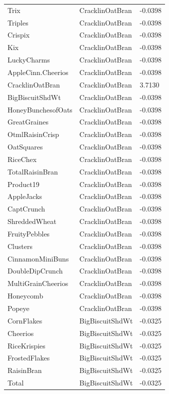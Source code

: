 \begin{table}[!htbp]
\begin{tabular}{lll}
\\
Trix & CracklinOatBran & -0.0398
\\
Triples & CracklinOatBran & -0.0398
\\
Crispix & CracklinOatBran & -0.0398
\\
Kix & CracklinOatBran & -0.0398
\\
LuckyCharms & CracklinOatBran & -0.0398
\\
AppleCinn.Cheerios & CracklinOatBran & -0.0398
\\
CracklinOatBran & CracklinOatBran & 3.7130
\\
BigBiscuitShdWt & CracklinOatBran & -0.0398
\\
HoneyBunchesofOats & CracklinOatBran & -0.0398
\\
GreatGraines & CracklinOatBran & -0.0398
\\
OtmlRaisinCrisp & CracklinOatBran & -0.0398
\\
OatSquares & CracklinOatBran & -0.0398
\\
RiceChex & CracklinOatBran & -0.0398
\\
TotalRaisinBran & CracklinOatBran & -0.0398
\\
Product19 & CracklinOatBran & -0.0398
\\
AppleJacks & CracklinOatBran & -0.0398
\\
CaptCrunch & CracklinOatBran & -0.0398
\\
ShreddedWheat & CracklinOatBran & -0.0398
\\
FruityPebbles & CracklinOatBran & -0.0398
\\
Clusters & CracklinOatBran & -0.0398
\\
CinnamonMiniBuns & CracklinOatBran & -0.0398
\\
DoubleDipCrunch & CracklinOatBran & -0.0398
\\
MultiGrainCheerios & CracklinOatBran & -0.0398
\\
Honeycomb & CracklinOatBran & -0.0398
\\
Popeye & CracklinOatBran & -0.0398
\\
CornFlakes & BigBiscuitShdWt & -0.0325
\\
Cheerios & BigBiscuitShdWt & -0.0325
\\
RiceKrispies & BigBiscuitShdWt & -0.0325
\\
FrostedFlakes & BigBiscuitShdWt & -0.0325
\\
RaisinBran & BigBiscuitShdWt & -0.0325
\\
Total & BigBiscuitShdWt & -0.0325
\\

\end{tabular}
\end{table}
